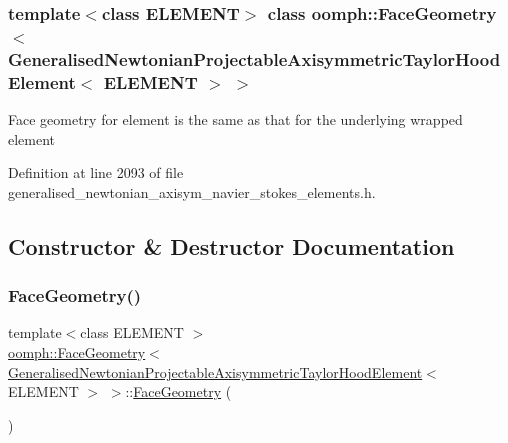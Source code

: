 \subsubsection*{template$<$class E\+L\+E\+M\+E\+NT$>$\newline
class oomph\+::\+Face\+Geometry$<$ Generalised\+Newtonian\+Projectable\+Axisymmetric\+Taylor\+Hood\+Element$<$ E\+L\+E\+M\+E\+N\+T $>$ $>$}

Face geometry for element is the same as that for the underlying wrapped element 

Definition at line 2093 of file generalised\+\_\+newtonian\+\_\+axisym\+\_\+navier\+\_\+stokes\+\_\+elements.\+h.



\subsection{Constructor \& Destructor Documentation}
\mbox{\label{classoomph_1_1FaceGeometry_3_01GeneralisedNewtonianProjectableAxisymmetricTaylorHoodElement_3_01ELEMENT_01_4_01_4_a9c7f67adc036f98898ae66ad778706ca}} 
\subsubsection{\texorpdfstring{Face\+Geometry()}{FaceGeometry()}}
{\footnotesize\ttfamily template$<$class E\+L\+E\+M\+E\+NT $>$ \\
\hyperlink{classoomph_1_1FaceGeometry}{oomph\+::\+Face\+Geometry}$<$ \hyperlink{classoomph_1_1GeneralisedNewtonianProjectableAxisymmetricTaylorHoodElement}{Generalised\+Newtonian\+Projectable\+Axisymmetric\+Taylor\+Hood\+Element}$<$ E\+L\+E\+M\+E\+NT $>$ $>$\+::\hyperlink{classoomph_1_1FaceGeometry}{Face\+Geometry} (\begin{DoxyParamCaption}{ }\end{DoxyParamCaption})\hspace{0.3cm}{\ttfamily [inline]}}



